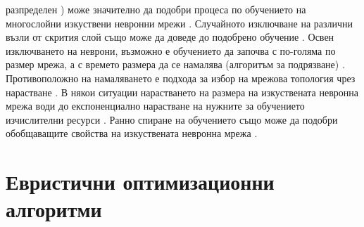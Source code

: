 разпределен \cite{Zur-01}) може значително да подобри процеса по обучението на многослойни изкуствени невронни мрежи \cite{Sietsma-01}. Случайното изключване на различни възли от скрития слой също може да доведе до подобрено обучение \cite{Sequin-01}. Освен изключването на неврони, възможно е обучението да започва с по-голяма по размер мрежа, а с времето размера да се намалява (алгоритъм за подрязване) \cite{Karnin-01}. Противоположно на намаляването е подхода за избор на мрежова топология чрез нарастване \cite{Yao-01}. В някои ситуации нарастването на размера на изкуствената невронна мрежа води до експоненциално нарастване на нужните за обучението изчислителни ресурси \cite{Wilamowski-01}. Ранно спиране на обучението също може да подобри обобщаващите свойства на изкуствената невронна мрежа \cite{Coulibaly-01}.

\section{Евристични оптимизационни алгоритми}

